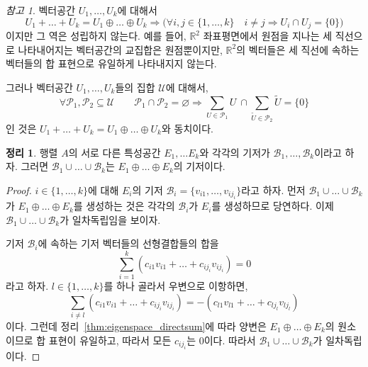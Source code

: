 \documentclass[unfonts,oneside,a4paper]{oblivoir}
\theoremstyle{definition}
\theoremstyle{theorem}
\newtheorem{theorem}{정리}[section]
\theoremstyle{theorem}
\theoremstyle{remark}
\newtheorem*{remark}{참고}
\theoremstyle{remark}
\theoremstyle{remark}
\theoremstyle{remark}
\renewcommand{\vec}[1]{\bm{\mathit{#1}}}
\newcommand{\vecz}{\bm{\mathrm{0}}}
\begin{document}
\begin{remark}
    벡터공간 $U_1, \dots, U_k$에 대해서
    \begin{equation*}
        U_1 + \dots + U_k = U_1 \oplus \dots \oplus U_k \Rightarrow \bigl(\forall i, j \in \{1, \dots, k\}\quad i \neq j \Rightarrow U_i \cap U_j = \{\vecz\}\bigr)
    \end{equation*}
    이지만 그 역은 성립하지 않는다.
    예를 들어, $\mathbb R^2$ 좌표평면에서 원점을 지나는 세 직선으로 나타내어지는 벡터공간의 교집합은 원점뿐이지만, $\mathbb R^2$의 벡터들은 세 직선에 속하는 벡터들의 합 표현으로 유일하게 나타내지지 않는다.

    그러나 벡터공간 $U_1, \dots, U_k$들의 집합 $\mathcal U$에 대해서,
    \begin{equation*}
        \forall \mathcal P_1, \mathcal P_2 \subseteq \mathcal U \qquad \mathcal P_1 \cap \mathcal P_2 = \varnothing \Rightarrow \sum_{U \in \mathcal P_1} U\ \cap \sum_{\tilde U \in \mathcal P_2} \tilde U = \{\vecz\}
    \end{equation*}
    인 것은 $U_1 + \dots + U_k = U_1 \oplus \dots \oplus U_k$와 동치이다.
\end{remark}

\begin{theorem}
    행렬 $A$의 서로 다른 특성공간 $E_1, \dots E_k$와 각각의 기저가 $\mathcal B_1, \dots, \mathcal B_k$이라고 하자.
    그러면 $\mathcal B_1 \cup \dots \cup \mathcal B_k$는 $E_1 \oplus \dots \oplus E_k$의 기저이다.
\end{theorem}

\begin{proof}
    $i \in \{1, \dots, k\}$에 대해 $E_i$의 기저 $\mathcal B_i = \{\vec v_{i1}, \dots, \vec v_{ij_i}\}$라고 하자.
    먼저 $\mathcal B_1 \cup \dots \cup \mathcal B_k$가 $E_1 \oplus \dots \oplus E_k$를 생성하는 것은 각각의 $\mathcal B_i$가 $E_i$를 생성하므로 당연하다.
    이제 $\mathcal B_1 \cup \dots \cup \mathcal B_k$가 일차독립임을 보이자.

    기저 $\mathcal B_i$에 속하는 기저 벡터들의 선형결합들의 합을
    \begin{equation*}
        \sum_{i = 1}^k (c_{i1} \vec v_{i1} + \dots + c_{ij_i} \vec v_{ij_i}) = \vecz
    \end{equation*}
    라고 하자.
    $l \in \{1, \dots, k\}$를 하나 골라서 우변으로 이항하면,
    \begin{equation*}
        \sum_{i \neq l} (c_{i1} \vec v_{i1} + \dots + c_{ij_i} \vec v_{ij_i}) = -(c_{l1} \vec v_{l1} + \dots + c_{lj_l} \vec v_{lj_l})
    \end{equation*}
    이다.
    그런데 정리~\ref{thm:eigenspace_directsum}에 따라 양변은 $E_1 \oplus \dots \oplus E_k$의 원소이므로 합 표현이 유일하고, 따라서 모든 $c_{ij_i}$는 0이다.
    따라서 $\mathcal B_1 \cup \dots \cup \mathcal B_k$가 일차독립이다.
\end{proof}
\end{document}
